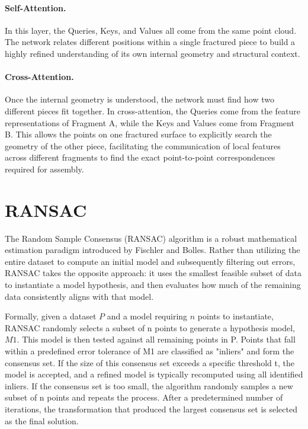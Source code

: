 \paragraph{Self-Attention.} In this layer, the Queries, Keys, and Values all come from the same point cloud. The network relates different positions within a single fractured piece to build a highly refined understanding of its own internal geometry and structural context.

\paragraph{Cross-Attention.} Once the internal geometry is understood, the network must find how two different pieces fit together. In cross-attention, the Queries come from the feature representations of Fragment A, while the Keys and Values come from Fragment B. This allows the points on one fractured surface to explicitly search the geometry of the other piece, facilitating the communication of local features across different fragments to find the exact point-to-point correspondences required for assembly.

\section{RANSAC}

The Random Sample Consensus (RANSAC) \cite{fischler1981random} algorithm is a robust mathematical estimation paradigm introduced by Fischler and Bolles. Rather than utilizing the entire dataset to compute an initial model and subsequently filtering out errors, RANSAC takes the opposite approach: it uses the smallest feasible subset of data to instantiate a model hypothesis, and then evaluates how much of the remaining data consistently aligns with that model.

\sloppy
Formally, given a dataset \(P\) and a model requiring \(n\) points to instantiate, RANSAC randomly selects a subset of n points to generate a hypothesis model, \(M1\). This model is then tested against all remaining points in P. Points that fall within a predefined error tolerance of M1 are classified as "inliers" and form the consensus set. If the size of this consensus set exceeds a specific threshold t, the model is accepted, and a refined model is typically recomputed using all identified inliers. If the consensus set is too small, the algorithm randomly samples a new subset of n points and repeats the process. After a predetermined number of iterations, the transformation that produced the largest consensus set is selected as the final solution.

